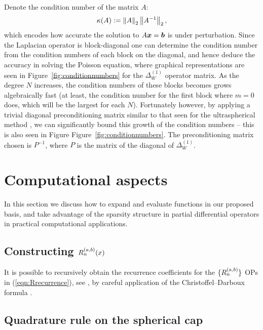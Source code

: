 \documentclass[11pt, oneside]{article}   	%
\begin{document}
Denote the condition number of the matrix $A$: 
\begin{align*}
	\kappa(A) := \left\| A \right\|_2 \left\| A^{-1} \right\|_2,
\end{align*}
which encodes how accurate the solution to $A \mbox{\boldmath$x$\unboldmath} = \mbox{\boldmath$b$\unboldmath}$ is under perturbation.
Since the Laplacian operator is block-diagonal one can determine the condition number from the condition numbers of each block on the diagonal,  and hence deduce the accuracy in solving the Poisson equation, where graphical representations are seen in Figure~\ref{fig:conditionnumbers} for the $\Delta^{(1)}_W$ operator matrix. As the degree $N$ increases, the condition numbers of these blocks becomes grows  algebraically fast (at least, the condition number for the first block where $m=0$ does, which will be the largest for each $N$). Fortunately however, by applying a trivial diagonal preconditioning matrix similar to that seen for the ultraspherical method \cite{olver2013fast}, we can significantly bound this growth of the condition numbers -- this is also seen in Figure Figure~\ref{fig:conditionnumbers}. The preconditioning matrix chosen is $P^{-1}$, where $P$ is the matrix of the diagonal of $\Delta^{(1)}_W$. 



%
\section{Computational aspects}\label{Section:Computation}

In this section we discuss how to expand and evaluate functions in our proposed basis, and take advantage of the sparsity structure in partial differential operators in practical computational applications.


\subsection{Constructing $R_n^{(a,b)}(x)$}

It is possible to recursively obtain the recurrence coefficients for the $\{R_n^{(a,b)}\}$ OPs in (\ref{eqn:Rrecurrence}), see \cite{snowball2019sparse}, by careful application of the Christoffel--Darboux formula \cite[18.2.12]{DLMF}.


\subsection{Quadrature rule on the spherical cap}\label{subsection:quadrule}
\end{document}
